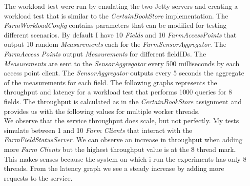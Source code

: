 \documentclass{article}      %
\begin{document}
The workload test were run by emulating the two Jetty servers and creating a workload test that is similar to the \emph{CertainBookStore} implementation. The \emph{FarmWorkloadConfig} contains parameters that can be modified for testing different scenarios. By default I have 10 \emph{Fields} and 10 \emph{FarmAccessPoints} that output 10 random \emph{Measurements} each for the \emph{FarmSensorAggregator}. The \emph{FarmAccess Points} output \emph{Measurements} for different fieldIDs. The \emph{Measurements} are sent to the \emph{SensorAggregator} every 500 milliseconds by each access point client. The \emph{SensorAggregator} outputs every 5 seconds the aggregate of the measurements for each field. The following graphs represents the throughput and latency for a workload test that performs 1000 queries for 8 fields. The throughput is calculated as in the \emph{CertainBookStore} assignment and provides us with the following values for multiple worker threads.\\

We observe that the service throughput does scale, but not perfectly. My tests simulate between 1 and 10 \emph{Farm Clients} that interact with the \emph{FarmFieldStatusServer}. We can observe an increase in throughput when adding more \emph{Farm Clients} but the highest throughput value is at the 8 thread mark. This makes senses because the system on which i run the experiments has only 8 threads. From the latency graph we see a steady increase by adding more requests to the service. 
\end{document}
